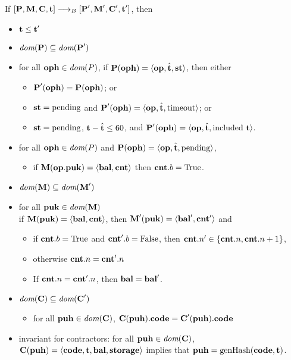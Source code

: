 \documentclass[a4paper]{llncs}
\begin{document}
If $[\textbf{P}, \textbf{M}, \textbf{C}, \textbf{t}] \stackrel{{}}\longrightarrow_B{}
[\textbf{P}', \textbf{M}', \textbf{C}', \textbf{t}']$, then
\begin{itemize}
\item $\textbf{t} \le \textbf{t}'$
\item $\textit{dom} (\textbf{P}) \subseteq \textit{dom}(\textbf{P}')$
\item for all $\textbf{oph} \in \textit{dom}(P)$, if 
  $\textbf{P} (\textbf{oph}) = \langle\textbf{op},  \hat{\textbf{t}}, \textbf{st}\rangle$, then either
  \begin{itemize}
  \item     $\textbf{P}'    (\textbf{oph}) = \textbf{P} (\textbf{oph})$; or
  \item $\textbf{st}  = \text{pending}$ and $\textbf{P}' (\textbf{oph}) =
    \langle\textbf{op}, \hat{\textbf{t}}, \text{timeout}\rangle$; or
  \item  $\textbf{st}  = \text{pending}$, $\textbf{t} - \hat{\textbf{t}}
    \le 60 $, and
    $\textbf{P}' (\textbf{oph}) =       \langle\textbf{op}, \hat{\textbf{t}}, \text{included}\
      \textbf{t}\rangle$.
  \end{itemize}
 \item for all $\textbf{oph} \in \textit{dom}(P)$ and $\textbf{P} (\textbf{oph}) = \langle\textbf{op},  \hat{\textbf{t}}, \text{pending}\rangle$, 
    \begin{itemize}
    	\item  if $\textbf{M}(\textbf{op}.\textbf{puk}) =  \langle\textbf{bal}, \textbf{cnt}\rangle$ then  
  $\textbf{cnt}.b = \text{True}$.
    \end{itemize}
 \item $ \textit{dom} (\textbf{M}) \subseteq \textit{dom} (\textbf{M}')$
 \item for all $\textbf{puk} \in \textit{dom} (\textbf{M})$\\
   if $\textbf{M} (\textbf{puk}) =
   \langle\textbf{bal}, \textbf{cnt}\rangle$, 
   then $\textbf{M}' (\textbf{puk}) =
   \langle\textbf{bal}', \textbf{cnt}'\rangle$ and
   \begin{itemize}
   \item if $\textbf{cnt}.b=\text{True}$ and $\textbf{cnt}'.b=\text{False}$, then $\textbf{cnt}.n' \in \{
     \textbf{cnt}.n,  \textbf{cnt}.n+1\}$,
   \item otherwise $\textbf{cnt}.n = \textbf{cnt}'.n$
   \item If $\textbf{cnt}.n = \textbf{cnt}'.n$, then $\textbf{bal} = \textbf{bal}'$.
   \end{itemize}

 \item $ \textit{dom} (\textbf{C}) \subseteq \textit{dom} (\textbf{C}')$
   \begin{itemize}
   \item for all $\textbf{puh} \in \textit{dom} (\textbf{C})$,
     $\textbf{C} (\textbf{puh}).\textbf{code} = \textbf{C}' (\textbf{puh}).\textbf{code}$
   \end{itemize}
 \item invariant for contractors:
   for all $\textbf{puh} \in \textit{dom} (\textbf{C})$,
   $\textbf{C} (\textbf{puh}) = \langle \textbf{code}, \textbf{t}, \textbf{bal}, \textbf{storage}\rangle$
   implies that $\textbf{puh} = \textup{genHash} (\textbf{code}, \textbf{t})$.
\end{itemize}
\end{document}
